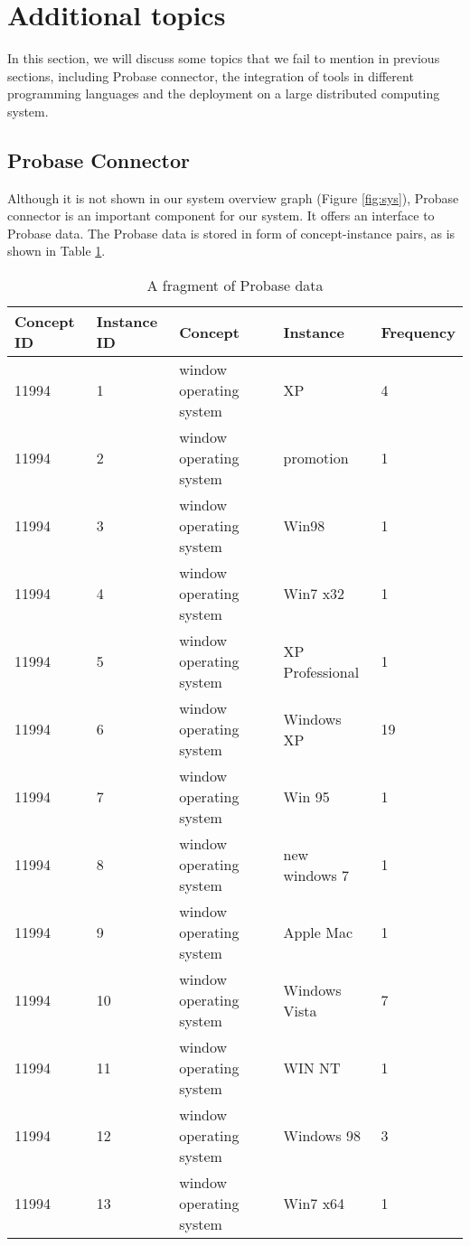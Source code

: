 \section{Additional topics}
\label{sec:additionalTopic}

In this section, we will discuss some topics that we fail to mention in previous sections, including Probase connector, the integration of tools in different programming languages and the deployment on a large distributed computing system.

\subsection{Probase Connector}
\label{probaseConnector}
Although it is not shown in our system overview graph (Figure \ref{fig:sys}), Probase connector is an important component for our system. It offers an interface to Probase data.
The Probase data is stored in form of concept-instance pairs, as is shown in Table \ref{tab:probaseData}.

\begin{table}
\centering
\caption{A fragment of Probase data}
\begin{tabular}{|l|l|l|l|l|} \hline
Concept ID&Instance ID&Concept&Instance&Frequency\\ \hline
11994&1&window operating system&XP&4\\
11994&2&window operating system&promotion&1\\
11994&3&window operating system&Win98&1\\
11994&4&window operating system&Win7 x32&1\\
11994&5&window operating system&XP Professional&1\\
11994&6&window operating system&Windows XP&19\\
11994&7&window operating system&Win 95&1\\
11994&8&window operating system&new windows 7&1\\
11994&9&window operating system&Apple Mac&1\\
11994&10&window operating system&Windows Vista&7\\
11994&11&window operating system&WIN NT&1\\
11994&12&window operating system&Windows 98&3\\
11994&13&window operating system&Win7 x64&1\\
\hline
\end{tabular}

\label{tab:probaseData}
\end{table}

